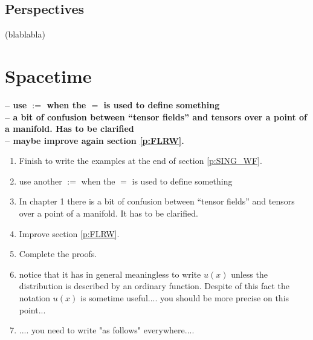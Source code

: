 \documentclass[11pt]{book}
\newcommand{\com}[1]{{\color{red}\bf #1}}
\theoremstyle{break}
\begin{document}
\section*{Perspectives}


(blablabla)



\chapter{Spacetime}
\label{p:SPACETIME}


\com{
-- use $:=$ when the $=$ is used to define something \\[4pt]
-- a bit of confusion between ``tensor fields'' and tensors over a point of a manifold. Has to be clarified \\[4pt]
-- maybe improve again section \ref{p:FLRW}.

\bigskip



\begin{enumerate}


\item Finish to write the examples at the end of section \ref{p:SING_WF}.


\item use another $:=$ when the $=$ is used to define something


\item In chapter 1 there is a bit of confusion between ``tensor fields'' and tensors over a point of a manifold. It has to be clarified.


\item Improve section \ref{p:FLRW}.


\item Complete the proofs.


\item notice that it has in general meaningless to write $u(x)$ unless the distribution is described by an ordinary function. Despite of this fact the notation $u(x)$ is sometime useful.... you should be more precise on this point...


\item .... you need to write "as follows" everywhere.... 

\end{enumerate}


\noindent
}
\end{document}
